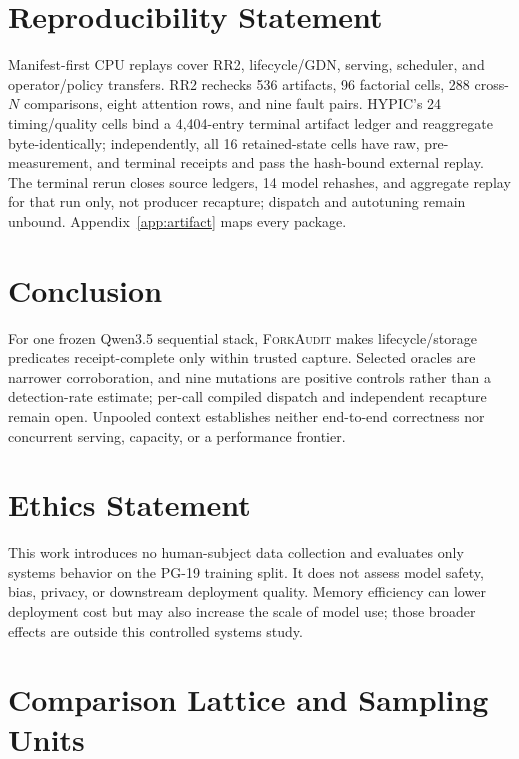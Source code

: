 \documentclass{article}
\newcommand{\method}{\textsc{ForkAudit}}
\begin{document}
\section{Reproducibility Statement}

Manifest-first CPU replays cover RR2, lifecycle/GDN, serving, scheduler, and
operator/policy transfers.  RR2 rechecks 536 artifacts, 96 factorial cells,
288 cross-$N$ comparisons, eight attention rows, and nine fault pairs.  HYPIC's
24 timing/quality cells bind a 4,404-entry terminal artifact ledger and
reaggregate byte-identically; independently, all 16 retained-state cells have
raw, pre-measurement, and terminal receipts and pass the hash-bound external
replay.  The terminal rerun closes source ledgers, 14 model rehashes,
and aggregate replay for that run only, not producer recapture; dispatch and
autotuning remain unbound.  Appendix~\ref{app:artifact} maps every package.

\section{Conclusion}

For one frozen Qwen3.5 sequential stack, \method{} makes lifecycle/storage
predicates receipt-complete only within trusted capture.  Selected oracles are
narrower corroboration, and nine mutations are positive controls rather than a
detection-rate estimate; per-call compiled dispatch and independent recapture
remain open.  Unpooled context establishes neither end-to-end correctness nor
concurrent serving, capacity, or a performance frontier.



\clearpage

\appendix

\section{Ethics Statement}

This work introduces no human-subject data collection and evaluates only
systems behavior on the PG-19 training split.  It does not assess model safety,
bias, privacy, or downstream deployment quality.  Memory efficiency can lower
deployment cost but may also increase the scale of model use; those broader
effects are outside this controlled systems study.

\section{Comparison Lattice and Sampling Units}
\label{app:lattice}
\end{document}
